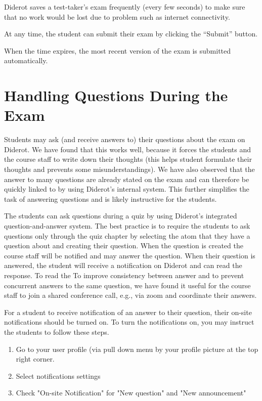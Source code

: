 \begin{gram}
Diderot saves a test-taker's exam frequently (every few seconds) to make sure that no work would be lost due to problem such as internet connectivity.  

At any time, the student can submit their exam by clicking the ``Submit'' button.

When the time expires, the most recent version of the exam is submitted automatically.
\end{gram}


\section{Handling Questions During the Exam}

Students may ask (and receive answers to) their questions about the
exam on Diderot.
%
We have found that this works well, because it forces the students and
the course staff to write down their thoughts (this helps student
formulate their thoughts and prevents some misunderstandings).
%
We have also observed that the answer to many questions are already
stated on the exam and can therefore be quickly linked to by using
Diderot's internal  system.
%
This further simplifies the task of answering questions and is likely
instructive for the students.


The students can ask questions during a quiz by using Diderot's
integrated question-and-answer system.
%
The best practice is to require the students to ask questions only
through the quiz chapter by selecting the atom that they have a
question about and creating their question.
%
When the question is created the course staff will be notified and may answer the question. 
%
When their question is answered, the student will receive a notification on Diderot and can read the response.
%
To read the 
%
To improve consistency between answer and to prevent concurrent answers to the same question, we have found it useful for the course staff to join a shared conference call, e.g., via zoom and coordinate their answers. 

\begin{gram} 
For a student to receive notification of an answer to their question,
their on-site notifications should be turned on.  
%
To turn the notifications on, you may instruct the students to follow
these steps.
\begin{enumerate}
\item  Go to your user profile (via pull down menu by your profile picture at the top right corner. 

\item Select notifications settings

\item Check "On-site Notification" for "New question" and "New announcement"
\end{enumerate}
\end{gram}



